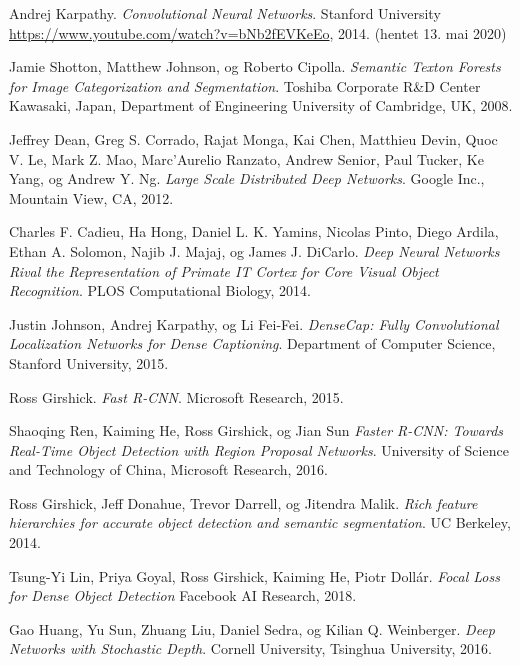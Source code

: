 \documentclass[11ot]{article}
\begin{document}
\begin{thebibliography}{9}
Andrej Karpathy. 
\textit{Convolutional Neural Networks}. 
Stanford University \url{https://www.youtube.com/watch?v=bNb2fEVKeEo}, 2014. (hentet 13. mai 2020)

Jamie Shotton, Matthew Johnson, og Roberto Cipolla. 
\textit{Semantic Texton Forests for Image Categorization and Segmentation}. 
Toshiba Corporate R\&D Center Kawasaki, Japan, Department of Engineering University of Cambridge, UK, 2008.

Jeffrey Dean, Greg S. Corrado, Rajat Monga, Kai Chen, Matthieu Devin, Quoc V. Le, Mark Z. Mao, Marc’Aurelio Ranzato, Andrew Senior, Paul Tucker, Ke Yang, og Andrew Y. Ng. 
\textit{Large Scale Distributed Deep Networks}. 
Google Inc., Mountain View, CA, 2012.

Charles F. Cadieu, Ha Hong, Daniel L. K. Yamins, Nicolas Pinto, Diego Ardila, Ethan A. Solomon,
Najib J. Majaj, og James J. DiCarlo. 
\textit{Deep Neural Networks Rival the Representation of Primate IT Cortex for Core Visual Object Recognition}. 
PLOS Computational Biology, 2014.

Justin Johnson, Andrej Karpathy, og Li Fei-Fei. 
\textit{DenseCap: Fully Convolutional Localization Networks for Dense Captioning}. 
Department of Computer Science, Stanford University, 2015.


Ross Girshick. 
\textit{Fast R-CNN}. 
Microsoft Research, 2015.

Shaoqing Ren, Kaiming He, Ross Girshick, og Jian Sun
\textit{Faster R-CNN: Towards Real-Time Object Detection with Region Proposal Networks}. 
University of Science and Technology of China, Microsoft Research, 2016.

Ross Girshick, Jeff Donahue, Trevor Darrell, og Jitendra Malik. 
\textit{Rich feature hierarchies for accurate object detection and semantic segmentation}. 
UC Berkeley, 2014.

Tsung-Yi Lin, Priya Goyal, Ross Girshick, Kaiming He, Piotr Dollár.
\textit{Focal Loss for Dense Object Detection}
Facebook AI Research, 2018.

Gao Huang, Yu Sun, Zhuang Liu, Daniel Sedra, og Kilian Q. Weinberger. 
\textit{Deep Networks with Stochastic Depth}. 
Cornell University, Tsinghua University, 2016.


\end{thebibliography}
\end{document}
